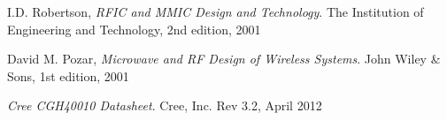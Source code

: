 

  \begin{thebibliography}{9}

		  I.D. Robertson, \emph{RFIC and MMIC Design and Technology}.
		  The Institution of Engineering and Technology,
		  2nd edition,
		  2001

		  David M. Pozar, \emph{Microwave and RF Design of Wireless Systems}.
		  John Wiley \& Sons,
		  1st edition,
		  2001

		  \emph{Cree CGH40010 Datasheet}.
		  Cree, Inc. 
		  Rev 3.2,
		  April 2012

  \end{thebibliography}
